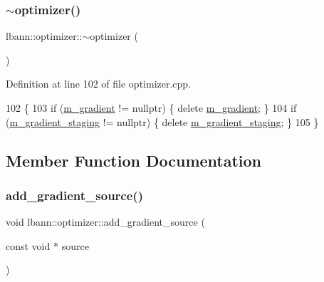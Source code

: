 \mbox{\label{classlbann_1_1optimizer_abbee0e2cb021f835b669d9ba0da5145a}} 
\subsubsection{\texorpdfstring{$\sim$optimizer()}{~optimizer()}}
{\footnotesize\ttfamily lbann\+::optimizer\+::$\sim$optimizer (\begin{DoxyParamCaption}{ }\end{DoxyParamCaption})\hspace{0.3cm}{\ttfamily [virtual]}}



Definition at line 102 of file optimizer.\+cpp.


\begin{DoxyCode}
102                       \{
103   \textcolor{keywordflow}{if} (\hyperlink{classlbann_1_1optimizer_a3df20cb0ae2b60430ad4fd235d66c12e}{m\_gradient} != \textcolor{keyword}{nullptr}) \{ \textcolor{keyword}{delete} \hyperlink{classlbann_1_1optimizer_a3df20cb0ae2b60430ad4fd235d66c12e}{m\_gradient}; \}
104   \textcolor{keywordflow}{if} (\hyperlink{classlbann_1_1optimizer_a92cd058d4f9fc8162d36d52461a96df2}{m\_gradient\_staging} != \textcolor{keyword}{nullptr})  \{ \textcolor{keyword}{delete} 
      \hyperlink{classlbann_1_1optimizer_a92cd058d4f9fc8162d36d52461a96df2}{m\_gradient\_staging}; \}
105 \}
\end{DoxyCode}


\subsection{Member Function Documentation}
\mbox{\label{classlbann_1_1optimizer_ade46d28f7df19cab6c6ee90c03e976ea}} 
\subsubsection{\texorpdfstring{add\+\_\+gradient\+\_\+source()}{add\_gradient\_source()}}
{\footnotesize\ttfamily void lbann\+::optimizer\+::add\+\_\+gradient\+\_\+source (\begin{DoxyParamCaption}\item[{const void $\ast$}]{source }\end{DoxyParamCaption})}

